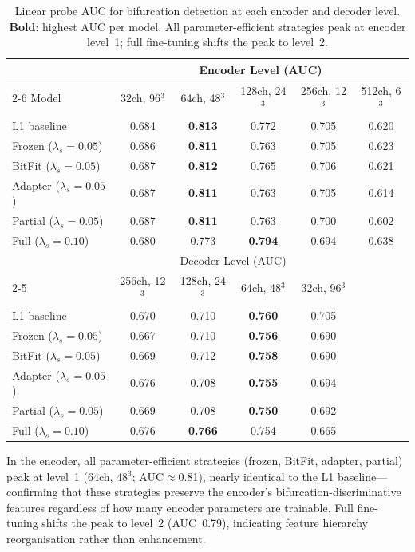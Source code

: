 \documentclass[runningheads]{llncs}
\begin{document}
\begin{table}[t]
\caption{Linear probe AUC for bifurcation detection at each encoder and decoder level. \textbf{Bold}: highest AUC per model. All parameter-efficient strategies peak at encoder level~1; full fine-tuning shifts the peak to level~2.}
\label{tab:probe}
\centering
\small
\begin{tabular}{lccccc}
\toprule
 & \multicolumn{5}{c}{Encoder Level (AUC)} \\
\cmidrule(lr){2-6}
Model & 32ch, 96$^3$ & 64ch, 48$^3$ & 128ch, 24$^3$ & 256ch, 12$^3$ & 512ch, 6$^3$ \\
\midrule
L1 baseline             & 0.684 & \textbf{0.813} & 0.772 & 0.705 & 0.620 \\
Frozen ($\lambda_s{=}0.05$)  & 0.686 & \textbf{0.811} & 0.763 & 0.705 & 0.623 \\
BitFit ($\lambda_s{=}0.05$)  & 0.687 & \textbf{0.812} & 0.765 & 0.706 & 0.621 \\
Adapter ($\lambda_s{=}0.05$) & 0.687 & \textbf{0.811} & 0.763 & 0.705 & 0.614 \\
Partial ($\lambda_s{=}0.05$) & 0.687 & \textbf{0.811} & 0.763 & 0.700 & 0.602 \\
Full ($\lambda_s{=}0.10$)    & 0.680 & 0.773 & \textbf{0.794} & 0.694 & 0.638 \\
\midrule
 & \multicolumn{4}{c}{Decoder Level (AUC)} & \\
\cmidrule(lr){2-5}
 & 256ch, 12$^3$ & 128ch, 24$^3$ & 64ch, 48$^3$ & 32ch, 96$^3$ & \\
\midrule
L1 baseline             & 0.670 & 0.710 & \textbf{0.760} & 0.705 & \\
Frozen ($\lambda_s{=}0.05$)  & 0.667 & 0.710 & \textbf{0.756} & 0.690 & \\
BitFit ($\lambda_s{=}0.05$)  & 0.669 & 0.712 & \textbf{0.758} & 0.690 & \\
Adapter ($\lambda_s{=}0.05$) & 0.676 & 0.708 & \textbf{0.755} & 0.694 & \\
Partial ($\lambda_s{=}0.05$) & 0.669 & 0.708 & \textbf{0.750} & 0.692 & \\
Full ($\lambda_s{=}0.10$)    & 0.676 & \textbf{0.766} & 0.754 & 0.665 & \\
\bottomrule
\end{tabular}
\end{table}

In the encoder, all parameter-efficient strategies (frozen, BitFit, adapter, partial) peak at level~1 (64ch, 48$^3$; AUC${\approx}$0.81), nearly identical to the L1 baseline---confirming that these strategies preserve the encoder's bifurcation-discriminative features regardless of how many encoder parameters are trainable.
Full fine-tuning shifts the peak to level~2 (AUC~0.79), indicating feature hierarchy reorganisation rather than enhancement.
\end{document}
